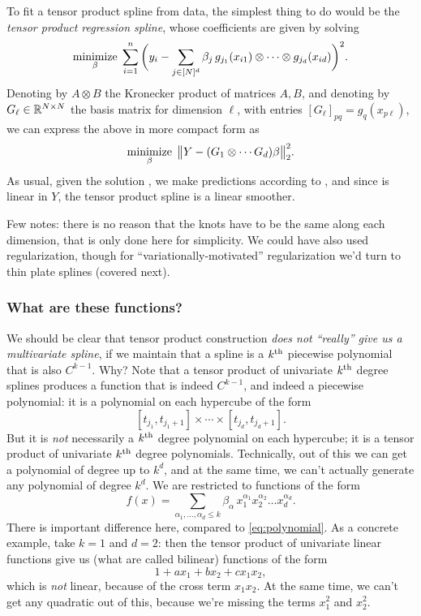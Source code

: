 \documentclass{article}
\begin{document}
To fit a tensor product spline from data, the simplest thing to do would be the 
\emph{tensor product regression spline}, whose coefficients are given by solving  
\[
\mathop{\mathrm{minimize}}_\beta \; \sum_{i=1}^n \bigg(y_i -  \sum_{j \in [N]^d} \beta_j \,
g_{j_1}(x_{i1}) \otimes \cdots \otimes g_{j_d}(x_{id}) \bigg)^2. 
\]
Denoting by $A \otimes B$ the Kronecker product of matrices $A,B$, and denoting
by $G_\ell \in \mathbb{R}^{N \times N}$ the basis matrix for dimension $\ell$, with
entries $[G_\ell]_{pq} = g_q(x_{p\ell})$, we can express the above in more
compact form as  
\[
\mathop{\mathrm{minimize}}_\beta \; \big\| Y - (G_1 \otimes \cdots G_d) \beta \big\|_2^2. 
\]
As usual, given the solution \smash{$\hbeta$},  we make predictions according to
, and since \smash{$\hbeta$} is linear in $Y$, the
tensor product spline \smash{$\hf$} is a linear smoother.

Few notes: there is no reason that the knots have to be the same along each 
dimension, that is only done here for simplicity. We could have also used
regularization, though for ``variationally-motivated'' regularization we'd turn 
to thin plate splines (covered next).

\subsubsection{What are these functions?} 

We should be clear that tensor product construction \emph{does not ``really'' 
  give us a multivariate spline}, if we maintain that a spline is a $k^{\text{th}}$
piecewise polynomial that is also $C^{k-1}$. Why? Note that a tensor product of
univariate $k^{\text{th}}$ degree splines produces a function that is indeed $C^{k-1}$,
and indeed a piecewise polynomial: it is a polynomial on each hypercube of the
form        
\[
[t_{j_1}, t_{j_1+1}] \times \cdots \times [t_{j_d}, t_{j_d+1}]. 
\]
But it is \emph{not} necessarily a $k^{\text{th}}$ degree polynomial on each
hypercube; it is a tensor product of univariate $k^{\text{th}}$ degree
polynomials. Technically, out of this we can get a polynomial of degree up to 
$k^d$, and at the same time, we can't actually generate any polynomial of degree 
$k^d$. We are restricted to functions of the form   
\[
f(x) = \sum_{\alpha_1,\dots,\alpha_d \leq k} \beta_\alpha \, x_1^{\alpha_1}
x_2^{\alpha_2} \dots x_d^{\alpha_d}.
\]
There is important difference here, compared to \eqref{eq:polynomial}. As a
concrete example, take $k=1$ and $d=2$: then the tensor product of univariate
linear functions give us (what are called bilinear) functions of the form
\[
1 + a x_1 + b x_2 + c x_1 x_2,
\]
which is \emph{not} linear, because of the cross term $x_1 x_2$. At the same
time, we can't get any quadratic out of this, because we're missing the terms
$x_1^2$ and $x_2^2$. 
\end{document}
